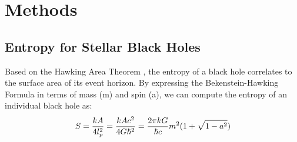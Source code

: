 \documentclass[twocolumn]{aastex631}
\begin{document}










\section{Methods} \label{sec:method}



\subsection{Entropy for Stellar Black Holes}
\label{subsec:bh_imf}
Based on the Hawking Area Theorem \citep{PhysRevLett.26.1344, Sarkar:2017qln, Isi_2019, Isi_2021, kontou2023generalizationhawkingblackhole, li2023testsnohairtheorembinary}, the entropy of a black hole correlates to the surface area of its event horizon. By expressing the Bekenstein-Hawking Formula \citep{PhysRevD.7.2333} in terms of mass (m) and spin (a), we can compute the entropy of an individual black hole as: 
\begin{equation}
\label{eq:entropy}
\centering
    S = \frac{kA}{4l_p^2} = \frac{kAc^2}{4G\hbar^2} = \frac{2\pi k G}{\hbar c} m^2 (1+\sqrt{1-a^2})
\end{equation}
\end{document}
